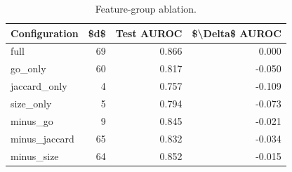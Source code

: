 \begin{table}[htbp]
\centering
\caption{Feature-group ablation.}
\label{tab:ablation_recomputed}
\begin{tabular}{lrrr}
\toprule
Configuration & \$d\$ & Test AUROC & \$\textbackslash Delta\$ AUROC \\
\midrule
full & 69 & 0.866 & 0.000 \\
go\_only & 60 & 0.817 & -0.050 \\
jaccard\_only & 4 & 0.757 & -0.109 \\
size\_only & 5 & 0.794 & -0.073 \\
minus\_go & 9 & 0.845 & -0.021 \\
minus\_jaccard & 65 & 0.832 & -0.034 \\
minus\_size & 64 & 0.852 & -0.015 \\
\bottomrule
\end{tabular}

\end{table}
